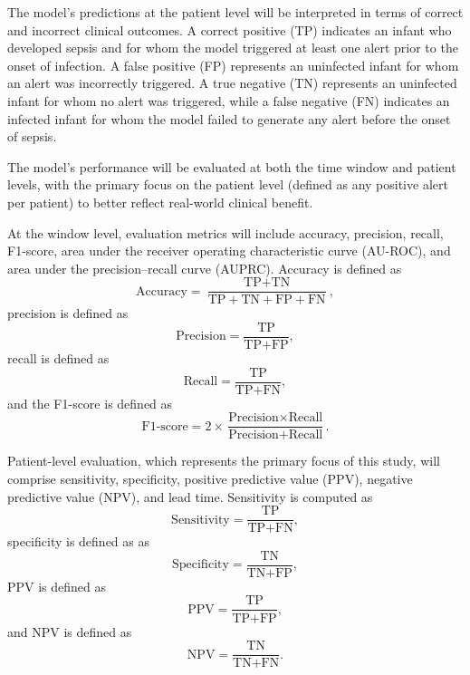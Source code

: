 \documentclass[conference]{IEEEtran}
\begin{document}
The model’s predictions at the patient level will be interpreted in terms of correct and incorrect clinical outcomes. A correct positive (TP) indicates an infant who developed sepsis and for whom the model triggered at least one alert prior to the onset of infection. A false positive (FP) represents an uninfected infant for whom an alert was incorrectly triggered. A true negative (TN) represents an uninfected infant for whom no alert was triggered, while a false negative (FN) indicates an infected infant for whom the model failed to generate any alert before the onset of sepsis.

The model’s performance will be evaluated at both the time window and patient levels, with the primary focus on the patient level (defined as any positive alert per patient) to better reflect real-world clinical benefit.

At the window level, evaluation metrics will include accuracy, precision, recall, F1-score, area under the receiver operating characteristic curve (AU-ROC), and area under the precision–recall curve (AUPRC). Accuracy is defined as
\begin{equation}
\text{Accuracy} = \frac{\text{TP} + \text{TN}}{\text{TP} + \text{TN} + \text{FP} + \text{FN}},
\end{equation}
precision is defined as
\begin{equation}
\text{Precision} = \frac{\text{TP}}{\text{TP} + \text{FP}},
\end{equation}
recall is defined as
\begin{equation}
\text{Recall} = \frac{\text{TP}}{\text{TP} + \text{FN}},
\end{equation}
and the F1-score is defined as
\begin{equation}
\text{F1-score} = 2 \times \frac{\text{Precision} \times \text{Recall}}{\text{Precision} + \text{Recall}}.
\end{equation}

Patient-level evaluation, which represents the primary focus of this study, will comprise sensitivity, specificity, positive predictive value (PPV), negative predictive value (NPV), and lead time. Sensitivity is computed as
\begin{equation}
\text{Sensitivity} = \frac{\text{TP}}{\text{TP} + \text{FN}},
\end{equation}
specificity is defined as as\begin{equation}
\text{Specificity} = \frac{\text{TN}}{\text{TN} + \text{FP}},
\end{equation}
PPV is defined as\begin{equation}
\text{PPV} = \frac{\text{TP}}{\text{TP} + \text{FP}},
\end{equation}
and NPV is defined as\begin{equation}
\text{NPV} = \frac{\text{TN}}{\text{TN} + \text{FN}}.
\end{equation}
\end{document}
